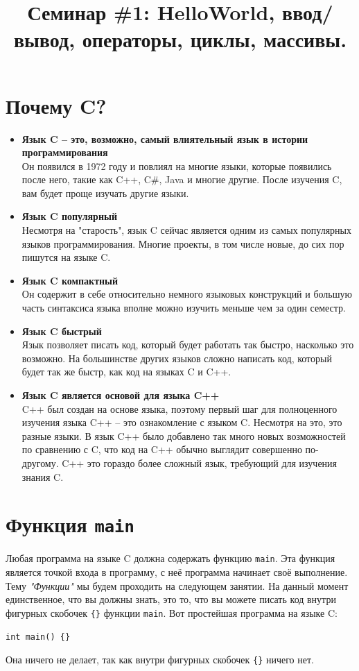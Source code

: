 \documentclass[10pt]{article}
\begin{document}
\title{Семинар \#1: HelloWorld, ввод/вывод, операторы, циклы, массивы. \vspace{-5ex}}\date{}\maketitle
\section*{Почему C?}
\begin{itemize}
\item \textbf{Язык C -- это, возможно, самый влиятельный язык в истории программирования}\\
Он появился в 1972 году и повлиял на многие языки, которые появились после него, такие как C++, C\#, Java и многие другие. После изучения C, вам будет проще изучать другие языки.

\item \textbf{Язык C популярный}\\
Несмотря на "старость"{}, язык C сейчас является одним из самых популярных языков программирования.
Многие проекты, в том числе новые, до сих пор пишутся на языке C.

\item \textbf{Язык C компактный}\\
Он содержит в себе относительно немного языковых конструкций и большую часть синтаксиса языка вполне можно 
изучить меньше чем за один семестр.

\item \textbf{Язык C быстрый}\\
Язык позволяет писать код, который будет работать так быстро, насколько это возможно.
На большинстве других языков сложно написать код, который будет так же быстр, как код на языках C и C++.


\item \textbf{Язык C является основой для языка C++}\\
C++ был создан на основе языка, поэтому первый шаг для полноценного изучения языка C++ -- это ознакомление с языком C.
Несмотря на это, это разные языки. В язык C++ было добавлено так много новых возможностей по сравнению с C,
что код на C++ обычно выглядит совершенно по-другому.
C++ это гораздо более сложный язык, требующий для изучения знания C.
\end{itemize}


\section*{Функция \texttt{main}}
\indent Любая программа на языке C должна содержать функцию \texttt{main}.
Эта функция является точкой входа в программу, с неё программа начинает своё выполнение.
Тему \textit{"Функции"} мы будем проходить на следующем занятии.
На данный момент единственное, что вы должны знать, это то, что вы можете писать код внутри фигурных скобочек \texttt{\{\}} функции \texttt{main}.
Вот простейшая программа на языке C: 
\begin{lstlisting}
int main() {}
\end{lstlisting}
Она ничего не делает, так как внутри фигурных скобочек \texttt{\{\}} ничего нет.
\end{document}
